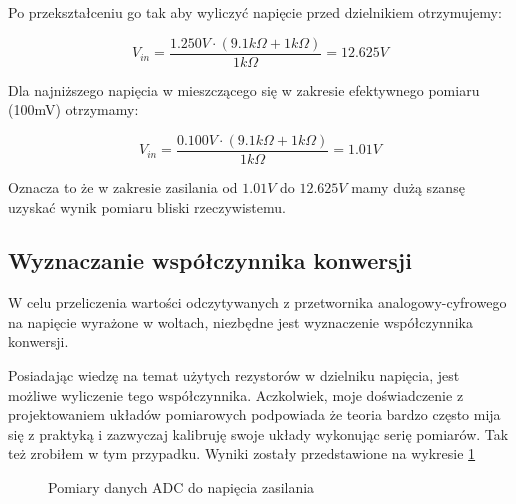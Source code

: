         Po przekształceniu go tak aby wyliczyć napięcie przed dzielnikiem otrzymujemy:
        
        \vspace{1em}
        \begin{displaymath}
         V_{in} = \frac{ 1.250V \cdot (9.1k \Omega  + 1k \Omega)  }{ 1k \Omega  } = 12.625 V
        \end{displaymath}
        \vspace{1em}
        
        Dla najniższego napięcia w mieszczącego się w zakresie efektywnego pomiaru (100mV) otrzymamy:
        
        \vspace{1em}
        \begin{displaymath}
         V_{in} = \frac{ 0.100V \cdot (9.1k \Omega  + 1k \Omega)  }{ 1k \Omega  } = 1.01 V
        \end{displaymath}      
        \vspace{1em}
        
        Oznacza to że w zakresie zasilania od $1.01V$ do $12.625V$ mamy dużą szansę uzyskać wynik pomiaru bliski rzeczywistemu.
        
    \newpage
        
    \subsection{Wyznaczanie współczynnika konwersji}
        W celu przeliczenia wartości odczytywanych z przetwornika analogowy-cyfrowego na napięcie wyrażone w woltach, niezbędne jest wyznaczenie współczynnika konwersji. 
        
        Posiadając wiedzę na temat użytych rezystorów w dzielniku napięcia, jest możliwe wyliczenie tego współczynnika. Aczkolwiek, moje doświadczenie z projektowaniem układów pomiarowych podpowiada że teoria bardzo często mija się z praktyką i zazwyczaj kalibruję swoje układy wykonując serię pomiarów. Tak też zrobiłem w tym przypadku. Wyniki zostały przedstawione na wykresie \ref{fig:adc_plot}
 
        \begin{figure}
        \vspace{1em}
            \centering
            \caption{Pomiary danych ADC do napięcia zasilania}
            \label{fig:adc_plot}
        \end{figure}
        \vspace{1em}
        
